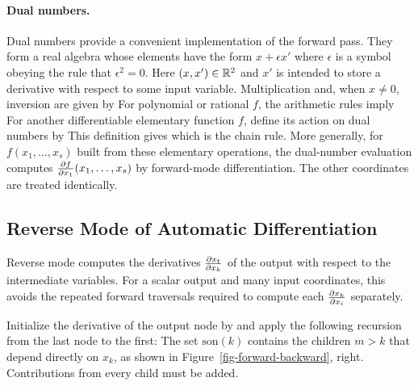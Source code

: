 \paragraph{Dual numbers.}

Dual numbers provide a convenient implementation of the forward pass. They form a real algebra whose elements have the form $x + \epsilon x'$ where $\epsilon$ is a symbol obeying the rule that $\epsilon^2=0$. Here $(x,x') \in \mathbb{R}^2$ and $x'$ is intended to store a derivative with respect to some input variable. Multiplication and, when $x\neq0$, inversion are given by
For polynomial or rational $f$, the arithmetic rules imply
For another differentiable elementary function $f$, define its action on dual numbers by
This definition gives
which is the chain rule. More generally, for $f(x_1,\ldots,x_s)$ built from these elementary operations,
the dual-number evaluation computes $\frac{ \partial f}{\partial x_1}(x_1,\ldots,x_s)$ by forward-mode differentiation. The other coordinates are treated identically.


\subsection{Reverse Mode of Automatic Differentiation}\label{sec-reverse-mode}

Reverse mode computes the derivatives $\frac{ \partial x_t}{\partial x_k}$ of the output with respect to the intermediate variables. For a scalar output and many input coordinates, this avoids the repeated forward traversals required to compute each $\frac{ \partial x_k}{\partial x_i}$ separately.



Initialize the derivative of the output node by
and apply the following recursion from the last node to the first:
%
The set $\text{son}(k)$ contains the children $m>k$ that depend directly on $x_k$, as shown in Figure~\ref{fig-forward-backward}, right. Contributions from every child must be added.

